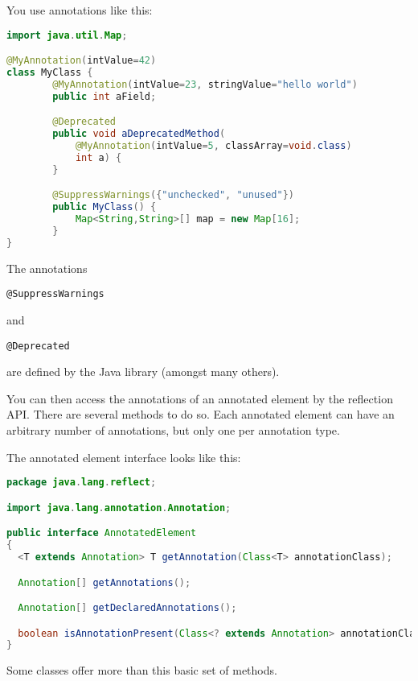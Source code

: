 \documentclass[a4paper, 10pt, titlepage]{scrartcl} %
\begin{document}
You use annotations like this:
\begin{lstlisting}[language=Java]
import java.util.Map;

@MyAnnotation(intValue=42)
class MyClass {
		@MyAnnotation(intValue=23, stringValue="hello world")
		public int aField;

		@Deprecated
		public void aDeprecatedMethod(
			@MyAnnotation(intValue=5, classArray=void.class)
			int a) {
		}

		@SuppressWarnings({"unchecked", "unused"})
		public MyClass() {
			Map<String,String>[] map = new Map[16];
		}
}
\end{lstlisting}

The annotations \begin{scriptsize}\verb||\hspace{0.0pt}\verb|@|\hspace{0.0pt}\verb|SuppressWarnings|\end{scriptsize} and \begin{scriptsize}\verb||\hspace{0.0pt}\verb|@|\hspace{0.0pt}\verb|Deprecated|\end{scriptsize} are defined by the
Java library (amongst many others).

You can then access the annotations of an annotated element by the reflection
API. There are several methods to do so. Each annotated element can have an
arbitrary number of annotations, but only one per annotation type.

The annotated element interface looks like this:
\begin{lstlisting}[language=Java]
package java.lang.reflect;

import java.lang.annotation.Annotation;

public interface AnnotatedElement
{
  <T extends Annotation> T getAnnotation(Class<T> annotationClass);

  Annotation[] getAnnotations();

  Annotation[] getDeclaredAnnotations();

  boolean isAnnotationPresent(Class<? extends Annotation> annotationClass);
}
\end{lstlisting}

Some classes offer more than this basic set of methods.
\end{document}
